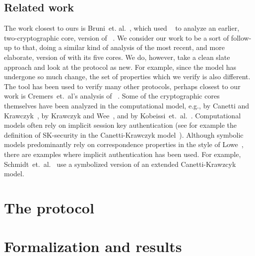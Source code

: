 \documentclass[runningheads,draft,x11names]{llncs}
\begin{document}
\subsection{Related work}
\label{sec:relatedWork}
The work closest to ours is Bruni~et. al.~\cite{DBLP:conf/secsr/BruniJPS18},
which used \mProverif~\cite{DBLP:conf/csfw/Blanchet01} to analyze an earlier,
two-cryptographic core, version of \mEdhoc~\cite{selander-ace-cose-ecdhe-08}.
%
We consider our work to be a sort of follow-up to that, doing a similar kind of
analysis of the most recent, and more elaborate, version of \mEdhoc{} with its
five cores.
%
We do, however, take a clean slate approach and look at the protocol as new.
%
For example, since the model has undergone so much change, the set of properties
which we verify is also different.
%
The \mTamarin{} tool has been used to verify many other protocols, perhaps
closest to our work is Cremers~et.~al's analysis of
\mTls~\cite{DBLP:conf/ccs/CremersHHSM17}.
%
Some of the cryptographic cores themselves have been analyzed in the
computational model, e.g., \mSigma{} by Canetti and
Krawczyk~\cite{DBLP:conf/crypto/CanettiK02}, \mOptls{} by Krawczyk and
Wee~\cite{DBLP:conf/eurosp/KrawczykW16}, and \mNoise{} by
Kobeissi~et.~al.~\cite{DBLP:conf/eurosp/KobeissiNB19}.
%
Computational models often rely on implicit session key authentication
(see for example the definition of SK-security in the Canetti-Krawczyk
model~\cite{DBLP:conf/crypto/CanettiK02}).
%
Although symbolic models predominantly rely on correspondence properties in the
style of Lowe~\cite{DBLP:conf/csfw/Lowe97a}, there are examples where implicit
authentication has been used.
%
For example, Schmidt~et.~al.~\cite{DBLP:conf/csfw/SchmidtMCB12} use a
symbolized version of an extended Canetti-Krawzcyk model.
%

\section{The \mEdhoc{} protocol}
\label{sec:edhoc}


\section{Formalization and results}
\label{sec:formalization}


\end{document}
